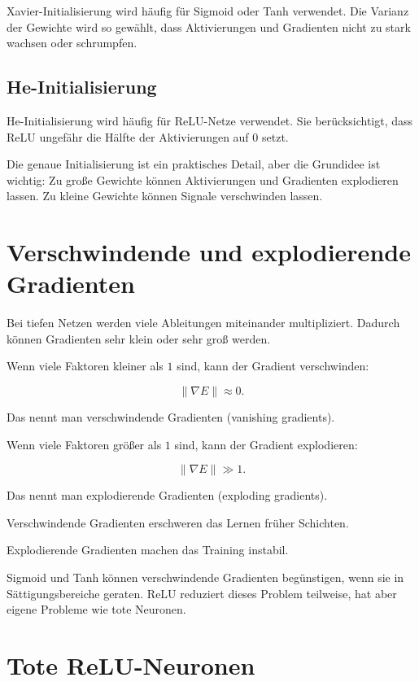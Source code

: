 Xavier-Initialisierung wird häufig für Sigmoid oder Tanh verwendet.
Die Varianz der Gewichte wird so gewählt, dass Aktivierungen und Gradienten nicht zu stark wachsen oder schrumpfen.

\subsection{He-Initialisierung}

He-Initialisierung wird häufig für ReLU-Netze verwendet.
Sie berücksichtigt, dass ReLU ungefähr die Hälfte der Aktivierungen auf \(0\) setzt.

\begin{notebox}
Die genaue Initialisierung ist ein praktisches Detail, aber die Grundidee ist wichtig:
Zu große Gewichte können Aktivierungen und Gradienten explodieren lassen.
Zu kleine Gewichte können Signale verschwinden lassen.
\end{notebox}

\section{Verschwindende und explodierende Gradienten}

Bei tiefen Netzen werden viele Ableitungen miteinander multipliziert.
Dadurch können Gradienten sehr klein oder sehr groß werden.

Wenn viele Faktoren kleiner als \(1\) sind, kann der Gradient verschwinden:

\[
    \|\nabla E\|
    \approx
    0.
\]

Das nennt man verschwindende Gradienten (vanishing gradients).

Wenn viele Faktoren größer als \(1\) sind, kann der Gradient explodieren:

\[
    \|\nabla E\|
    \gg
    1.
\]

Das nennt man explodierende Gradienten (exploding gradients).

\begin{conceptbox}
Verschwindende Gradienten erschweren das Lernen früher Schichten.

Explodierende Gradienten machen das Training instabil.
\end{conceptbox}

Sigmoid und Tanh können verschwindende Gradienten begünstigen, wenn sie in Sättigungsbereiche geraten.
ReLU reduziert dieses Problem teilweise, hat aber eigene Probleme wie tote Neuronen.

\section{Tote ReLU-Neuronen}

